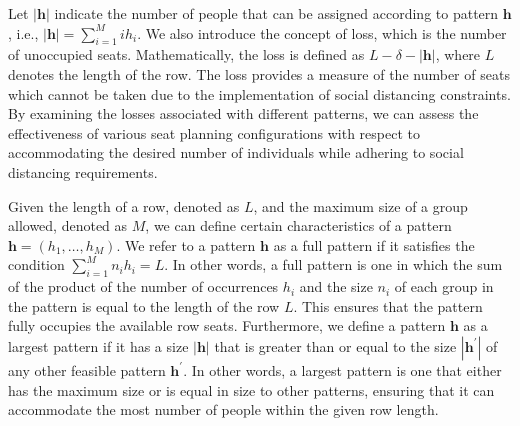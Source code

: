 Let $|\bm{h}|$ indicate the number of people that can be assigned according to pattern $\bm{h}$, i.e., $|\bm{h}| = \sum_{i =1}^{M} i h_i$. We also introduce the concept of loss, which is the number of unoccupied seats. Mathematically, the loss is defined as $L- \delta - |\bm{h}|$, where $L$ denotes the length of the row. The loss provides a measure of the number of seats which cannot be taken due to the implementation of social distancing constraints. By examining the losses associated with different patterns, we can assess the effectiveness of various seat planning configurations with respect to accommodating the desired number of individuals while adhering to social distancing requirements.

\begin{definition}
Given the length of a row, denoted as $L$, and the maximum size of a group allowed, denoted as $M$, we can define certain characteristics of a pattern $\bm{h} = (h_1, \ldots, h_M)$.
We refer to a pattern $\bm{h}$ as a full pattern if it satisfies the condition $\sum_{i=1}^{M} n_i h_i = L$. In other words, a full pattern is one in which the sum of the product of the number of occurrences $h_i$ and the size $n_i$ of each group in the pattern is equal to the length of the row $L$. This ensures that the pattern fully occupies the available row seats.
Furthermore, we define a pattern $\bm{h}$ as a largest pattern if it has a size $|\bm{h}|$ that is greater than or equal to the size $|\bm{h}^{\prime}|$ of any other feasible pattern $\bm{h}^{\prime}$. In other words, a largest pattern is one that either has the maximum size or is equal in size to other patterns, ensuring that it can accommodate the most number of people within the given row length.
\end{definition}





